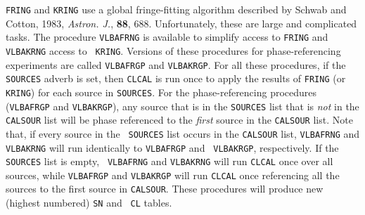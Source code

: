 {\tt FRING} and {\tt KRING} use a global fringe-fitting algorithm
described by Schwab and Cotton, 1983, {\it Astron. J.\/}, {\bf 88},
688.  Unfortunately, these are large and complicated tasks.
The procedure {\tt VLBAFRNG} is available
to simplify access to {\tt FRING} and {\tt VLBAKRNG} access to {\tt
KRING}\@.  Versions of these procedures for phase-referencing
experiments are called {\tt VLBAFRGP} and {\tt VLBAKRGP}\@.
For all these procedures, if the {\tt SOURCES} adverb is set, then
{\tt CLCAL} is run once to apply the results of {\tt FRING} (or {\tt
KRING}) for each source in {\tt SOURCES}\@.  For the
phase-referencing procedures ({\tt VLBAFRGP} and {\tt VLBAKRGP}), any
source that is in the {\tt SOURCES} list that is {\it not\/} in the
{\tt CALSOUR} list will be phase referenced to the {\it first} source
in the {\tt CALSOUR} list.  Note that, if every source in the {\tt
SOURCES} list occurs in the {\tt CALSOUR} list, {\tt VLBAFRNG} and
{\tt VLBAKRNG} will run identically to {\tt VLBAFRGP} and {\tt
VLBAKRGP}, respectively. If the {\tt SOURCES} list is empty, {\tt
VLBAFRNG} and {\tt VLBAKRNG} will run {\tt CLCAL} once over all
sources, while {\tt VLBAFRGP} and {\tt VLBAKRGP} will run {\tt CLCAL}
once referencing all the sources to the first source in {\tt CALSOUR}.
These procedures will produce new (highest numbered) {\tt SN} and {\tt
CL} tables.

